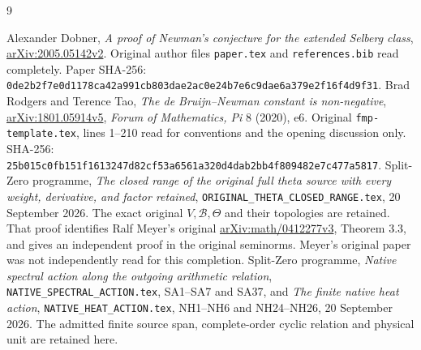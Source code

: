 \documentclass[11pt]{article}
\newcommand{\B}{\mathscr B}\newcommand{\Epi}{\mathscr E_\pi}
\begin{document}
\begin{thebibliography}{9}\raggedright
{} Alexander Dobner,
\emph{A proof of Newman's conjecture for the extended Selberg class},
\href{https://arxiv.org/abs/2005.05142v2}{arXiv:2005.05142v2}.
Original author files \texttt{paper.tex} and \texttt{references.bib}
read completely. Paper SHA-256:
\texttt{0de2b2f7e0d1178ca42a991cb803dae2ac0e24b7e6c9dae6a379e2f16f4d9f31}.
 Brad Rodgers and Terence Tao,
\emph{The de Bruijn--Newman constant is non-negative},
\href{https://arxiv.org/abs/1801.05914v5}{arXiv:1801.05914v5},
\emph{Forum of Mathematics, Pi} 8 (2020), e6.
Original \texttt{fmp-template.tex}, lines 1--210 read for conventions
and the opening discussion only. SHA-256:
\texttt{25b015c0fb151f1613247d82cf53a6561a320d4dab2bb4f809482e7c477a5817}.
 Split-Zero programme,
\emph{The closed range of the original full theta source with every
weight, derivative, and factor retained},
\texttt{ORIGINAL\_THETA\_CLOSED\_RANGE.tex}, 20 September 2026.
The exact original $V,\B,\Theta$ and their topologies are retained.
That proof identifies Ralf Meyer's original
\href{https://arxiv.org/abs/math/0412277v3}{arXiv:math/0412277v3},
Theorem 3.3, and gives an independent proof in the original seminorms.
Meyer's original paper was not independently read for this completion.
 Split-Zero programme,
\emph{Native spectral action along the outgoing arithmetic relation},
\texttt{NATIVE\_SPECTRAL\_ACTION.tex}, SA1--SA7 and SA37, and
\emph{The finite native heat action},
\texttt{NATIVE\_HEAT\_ACTION.tex}, NH1--NH6 and NH24--NH26,
20 September 2026. The admitted finite source span, complete-order
cyclic relation and physical unit are retained here.
\end{thebibliography}
\end{document}

